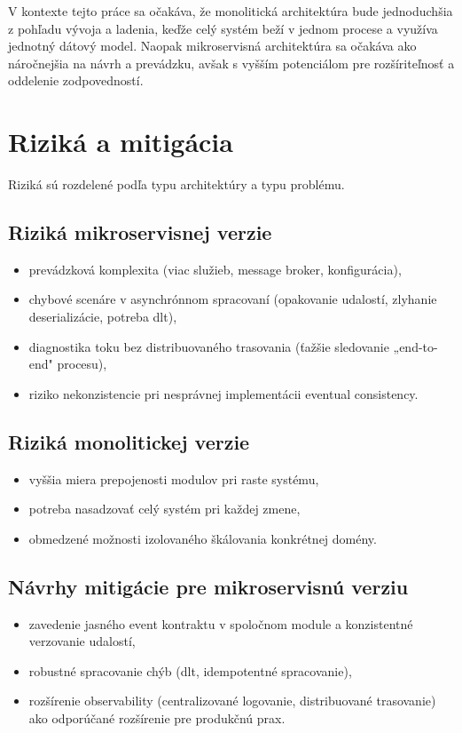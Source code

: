 V kontexte tejto práce sa očakáva, že monolitická architektúra bude jednoduchšia z pohľadu vývoja a ladenia, keďže celý systém beží v jednom procese a využíva jednotný dátový model. Naopak mikroservisná architektúra sa očakáva ako náročnejšia na návrh a prevádzku, avšak s vyšším potenciálom pre rozšíriteľnosť a oddelenie zodpovedností.

\section{Riziká a mitigácia}

Riziká sú rozdelené podľa typu architektúry a typu problému.

\subsection*{Riziká mikroservisnej verzie}
\begin{itemize}
    \item prevádzková komplexita (viac služieb, message broker, konfigurácia),
    \item chybové scenáre v asynchrónnom spracovaní (opakovanie udalostí, zlyhanie deserializácie, potreba \acrshort{dlt}),
    \item diagnostika toku bez distribuovaného trasovania (ťažšie sledovanie „end-to-end" procesu),
    \item riziko nekonzistencie pri nesprávnej implementácii eventual consistency.
\end{itemize}

\subsection*{Riziká monolitickej verzie}
\begin{itemize}
    \item vyššia miera prepojenosti modulov pri raste systému,
    \item potreba nasadzovať celý systém pri každej zmene,
    \item obmedzené možnosti izolovaného škálovania konkrétnej domény.
\end{itemize}

\subsection*{Návrhy mitigácie pre mikroservisnú verziu}
\begin{itemize}
    \item zavedenie jasného event kontraktu v spoločnom module a konzistentné verzovanie udalostí,
    \item robustné spracovanie chýb (\acrshort{dlt}, idempotentné spracovanie),
    \item rozšírenie observability (centralizované logovanie, distribuované trasovanie) ako odporúčané rozšírenie pre produkčnú prax.
\end{itemize}

